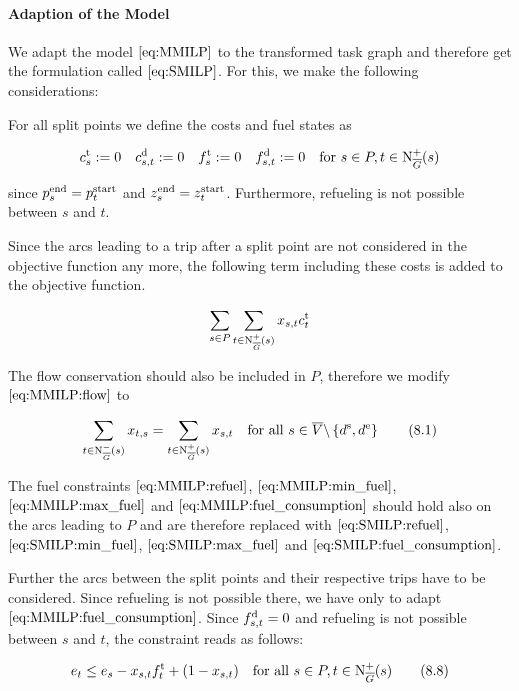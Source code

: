 \paragraph{Adaption of the Model} \parfill

We adapt the model $\eqref{eq:MMILP}$ to the transformed task graph and therefore get the formulation called $\eqref{eq:SMILP}$. For this, we make the following considerations:

For all split points we define the costs and fuel states as

\begin{align*}
	c^{\operatorname{t}}_s := 0 && c^{\operatorname{d}}_{s,t} := 0 && f^{\operatorname{t}}_s := 0 && f^{\operatorname{d}}_{s,t} := 0 && \text{for } s\in P,t\in\operatorname{N}_{\overline{G}}^+(s)
\end{align*}

since $p^{\operatorname{end}}_s = p^{\operatorname{start}}_t$ and $z^{\operatorname{end}}_s = z^{\operatorname{start}}_t$. Furthermore, refueling is not possible between $s$ and $t$.

Since the arcs leading to a trip after a split point are not considered in the objective function any more, the following term including these costs is added to the objective function.

\begin{align}
	\sum_{s\in P}\sum_{t\in\operatorname{N}_{\overline{G}}^+(s)}x_{s,t}c^{\operatorname{t}}_t
\end{align}

The flow conservation should also be included in $P$, therefore we modify $\eqref{eq:MMILP:flow}$ to

\begin{align}
	\sum_{t\in\operatorname{N}_{\overline{G}}^-(s)} x_{t,s} = \sum_{t\in\operatorname{N}_{\overline{G}}^+(s)} x_{s,t} & & \text{for all } s\in \overline{V}\backslash\left\{d^{\operatorname{s}},d^{\operatorname{e}}\right\} \tag{8.1} \label{eq:SMILP:flow}
\end{align}

The fuel constraints $\eqref{eq:MMILP:refuel}$, $\eqref{eq:MMILP:min_fuel}$, $\eqref{eq:MMILP:max_fuel}$ and $\eqref{eq:MMILP:fuel_consumption}$ should hold also on the arcs leading to $P$ and are therefore replaced with $\eqref{eq:SMILP:refuel}$, $\eqref{eq:SMILP:min_fuel}$, $\eqref{eq:SMILP:max_fuel}$ and $\eqref{eq:SMILP:fuel_consumption}$.

Further the arcs between the split points and their respective trips have to be considered. Since refueling is not possible there, we have only to adapt $\eqref{eq:MMILP:fuel_consumption}$. Since $f^{\operatorname{d}}_{s,t} = 0$ and refueling is not possible between $s$ and $t$, the constraint reads as follows:

\begin{align}
	e_t \leq e_s - x_{s,t}f^{\operatorname{t}}_t + \left(1-x_{s,t}\right) && \text{for all } s\in P,t\in\operatorname{N}_{\overline{G}}^+(s) \tag{8.8} \label{eq:SMILP:fuel_splitpoint}
\end{align}

